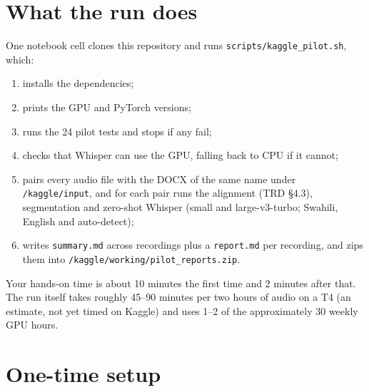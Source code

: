 \documentclass[11pt]{article}
\begin{document}
{\small\setlength{\parskip}{0pt}\setcounter{tocdepth}{1}\tableofcontents}
\bigskip

\section{What the run does}\label{what-the-run-does}

One notebook cell clones this repository and runs \texttt{scripts/kaggle\_pilot.sh}, which:

\begin{enumerate}[label=\arabic*.]
\item installs the dependencies;
\item prints the GPU and PyTorch versions;
\item runs the 24 pilot tests and stops if any fail;
\item checks that Whisper can use the GPU, falling back to CPU if it cannot;
\item pairs every audio file with the DOCX of the same name under \texttt{/kaggle/input}, and for each pair runs the alignment (TRD §4.3), segmentation and zero-shot Whisper (small and large-v3-turbo; Swahili, English and auto-detect);
\item writes \texttt{summary.md} across recordings plus a \texttt{report.md} per recording, and zips them into \texttt{/kaggle/\allowbreak{}working/\allowbreak{}pilot\_reports.zip}.
\end{enumerate}

Your hands-on time is about 10 minutes the first time and 2 minutes after that. The run itself takes roughly 45--90 minutes per two hours of audio on a T4 (an estimate, not yet timed on Kaggle) and uses 1--2 of the approximately 30 weekly GPU hours.

\section{One-time setup}\label{one-time-setup}
\end{document}
